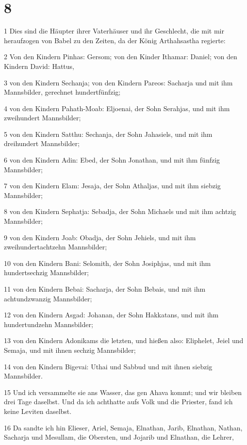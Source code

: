\chapter{8}

\par 1 Dies sind die Häupter ihrer Vaterhäuser und ihr Geschlecht, die mit mir heraufzogen von Babel zu den Zeiten, da der König Arthahsastha regierte:
\par 2 Von den Kindern Pinhas: Gersom; von den Kinder Ithamar: Daniel; von den Kindern David: Hattus,
\par 3 von den Kindern Sechanja; von den Kindern Pareos: Sacharja und mit ihm Mannsbilder, gerechnet hundertfünfzig;
\par 4 von den Kindern Pahath-Moab: Eljoenai, der Sohn Serahjas, und mit ihm zweihundert Mannsbilder;
\par 5 von den Kindern Satthu: Sechanja, der Sohn Jahasiels, und mit ihm dreihundert Mannsbilder;
\par 6 von den Kindern Adin: Ebed, der Sohn Jonathan, und mit ihm fünfzig Mannsbilder;
\par 7 von den Kindern Elam: Jesaja, der Sohn Athaljas, und mit ihm siebzig Mannsbilder;
\par 8 von den Kindern Sephatja: Sebadja, der Sohn Michaels und mit ihm achtzig Mannsbilder;
\par 9 von den Kindern Joab: Obadja, der Sohn Jehiels, und mit ihm zweihundertachtzehn Mannsbilder;
\par 10 von den Kindern Bani: Selomith, der Sohn Josiphjas, und mit ihm hundertsechzig Mannsbilder;
\par 11 von den Kindern Bebai: Sacharja, der Sohn Bebais, und mit ihm achtundzwanzig Mannsbilder;
\par 12 von den Kindern Asgad: Johanan, der Sohn Hakkatans, und mit ihm hundertundzehn Mannsbilder;
\par 13 von den Kindern Adonikams die letzten, und hießen also: Eliphelet, Jeiel und Semaja, und mit ihnen sechzig Mannsbilder;
\par 14 von den Kindern Bigevai: Uthai und Sabbud und mit ihnen siebzig Mannsbilder.
\par 15 Und ich versammelte sie ans Wasser, das gen Ahava kommt; und wir bleiben drei Tage daselbst. Und da ich achthatte aufs Volk und die Priester, fand ich keine Leviten daselbst.
\par 16 Da sandte ich hin Elieser, Ariel, Semaja, Elnathan, Jarib, Elnathan, Nathan, Sacharja und Mesullam, die Obersten, und Jojarib und Elnathan, die Lehrer,
